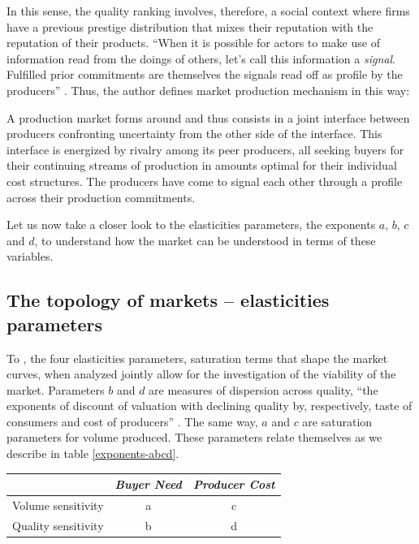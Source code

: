 \documentclass[a4paper, 12pt, openright, oneside, german, french, brazil, english, article]{abntex2}
\begin{document}
	In this sense, the quality ranking involves, therefore, a social context where firms have a previous prestige distribution that mixes their reputation with the reputation of their products. ``When it is possible for actors to make use of information read from the doings of others, let's call this information a \textit{signal}. Fulfilled prior commitments are themselves the signals read off as profile by the producers'' \cite[p. 16]{white2002markets}. Thus, the author defines market production mechanism in this way:
	
	\begin{citacao}
		A production market forms around and thus consists in a joint interface between producers confronting uncertainty from the other side of the interface. This interface is energized by rivalry among its peer producers, all seeking buyers for their continuing streams of production in amounts optimal for their individual cost structures. The producers have come to signal each other through a profile across their production commitments. \cite[p. 27]{white2002markets}
	\end{citacao}
	
	Let us now take a closer look to the elasticities parameters, the exponents $a$, $b$, $c$ and $d$, to understand how the market can be understood in terms of these variables.
	
	\subsection{The topology of markets -- elasticities parameters}
	
	To , the four elasticities parameters, saturation terms that shape the market curves, when analyzed jointly allow for the investigation of the viability of the market. Parameters $b$ and $d$ are measures of dispersion across quality, ``the exponents of discount of valuation with declining quality by, respectively, taste of consumers and cost of producers'' \cite[p. 50]{white2002markets}. The same way, $a$ and $c$ are saturation parameters for volume produced. These parameters relate themselves as we describe in table \ref{exponents-abcd}.
	
	\begin{table}[ht]
	{\begin{tabular}{l c c}
			\hline
			\hline
			   					& \textit{Buyer Need} & \textit{Producer Cost} \\
			\hline
			Volume sensitivity	& a					  & c						\\
			Quality sensitivity	& b					  & d						\\
			\hline			
		\end{tabular}
	}
	{}
	\end{table}
		
\end{document}
